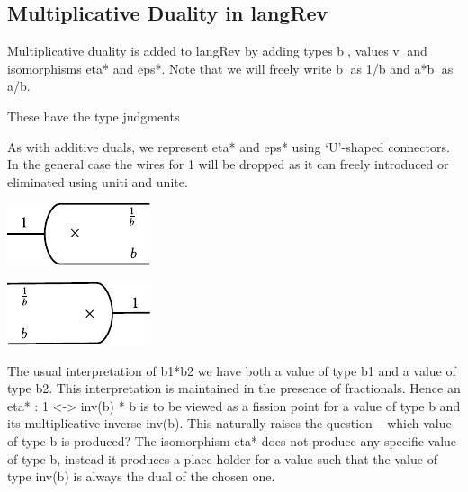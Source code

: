 \documentclass[preprint]{sigplanconf}
\begin{document}
{%
\subsection{Multiplicative Duality in {{langRev}} }

Multiplicative duality is added to {{langRev}} by adding types
{{b^^^}}, values {{v^^^}} and isomorphisms {{eta*}} and {{eps*}}.
Note that we will freely write {{b^^^}} as {{1/b}} and {{a*b^^^}} as
{{a/b}}.

%

\noindent
These have the type judgments



As with additive duals, we represent {{eta*}} and {{eps*}} using
`U'-shaped connectors. In the general case the wires for {{1}} will be
dropped as it can freely introduced or eliminated using {{uniti}} and
{{unite}}. 

\begin{multicols}{2}
\begin{center}
  \includegraphics{diagrams/eta_times.pdf}
\end{center}
  
\begin{center}
  \includegraphics{diagrams/eps_times.pdf}
\end{center}
\end{multicols}

The usual interpretation of {{b1*b2}} we have both a value of type
{{b1}} and a value of type {{b2}}. This interpretation is maintained
in the presence of fractionals. Hence an {{eta* : 1 <-> inv(b) * b}} is
to be viewed as a fission point for a value of type {{b}} and its
multiplicative inverse {{inv(b)}}. This naturally raises the question --
which value of type {{b}} is produced? The isomorphism {{eta*}} does
not produce any specific value of type {{b}}, instead it produces a
place holder for a value such that the value of type {{inv(b)}} is
always the dual of the chosen one. 

}
\end{document}
